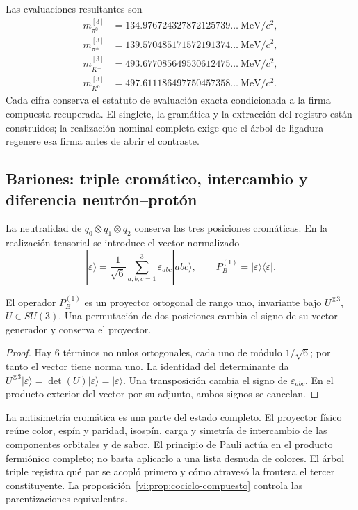 Las evaluaciones resultantes son
\begin{align*}
 m_{\pi^0}^{[3]}&=134.976724327872125739\ldots\ \mathrm{MeV}/c^2,\\
 m_{\pi^\pm}^{[3]}&=139.570485171572191374\ldots\ \mathrm{MeV}/c^2,\\
 m_{K^\pm}^{[3]}&=493.677085649530612475\ldots\ \mathrm{MeV}/c^2,\\
 m_{K^0}^{[3]}&=497.611186497750457358\ldots\ \mathrm{MeV}/c^2.
\end{align*}
Cada cifra conserva el
estatuto de evaluación exacta condicionada a la firma compuesta
recuperada. El singlete, la gramática y la extracción del registro están
construidos; la realización nominal completa exige que el árbol de
ligadura regenere esa firma antes de abrir el contraste.

\subsection{Bariones: triple cromático, intercambio y diferencia neutrón--protón}
\label{vi:subsec:bariones-familias}

La neutralidad de \(q_0\otimes q_1\otimes q_2\) conserva las tres
posiciones cromáticas. En la realización tensorial se introduce el vector
normalizado
\[
 |\varepsilon\rangle=\frac1{\sqrt6}
 \sum_{a,b,c=1}^3\varepsilon_{abc}|abc\rangle,
 \qquad P_B^{(1)}=|\varepsilon\rangle\langle\varepsilon|.
\]

\begin{proposition}
\label{vi:prop:singlete-barion}
El operador \(P_B^{(1)}\) es un proyector ortogonal de rango uno,
invariante bajo \(U^{\otimes3}\), \(U\in SU(3)\). Una permutación
de dos posiciones cambia el signo de su vector generador y conserva
el proyector.
\end{proposition}
\begin{proof}
Hay \(6\) términos no nulos ortogonales, cada uno de módulo
\(1/\sqrt6\); por tanto el vector tiene norma uno. La identidad
del determinante da
\(U^{\otimes3}|\varepsilon\rangle=
\det(U)|\varepsilon\rangle=|\varepsilon\rangle\).
Una transposición cambia el signo de \(\varepsilon_{abc}\). En el
producto exterior del vector por su adjunto, ambos signos se cancelan.
\end{proof}

La antisimetría cromática es una parte del estado completo. El proyector
físico reúne color, espín y paridad, isospín, carga y simetría de
intercambio de las componentes orbitales y de sabor. El principio de
Pauli actúa en el producto fermiónico completo; no basta aplicarlo a una
lista desnuda de colores. El árbol triple registra qué par se acopló
primero y cómo atravesó la frontera el tercer constituyente. La
proposición~\ref{vi:prop:cociclo-compuesto} controla las
parentizaciones equivalentes.


